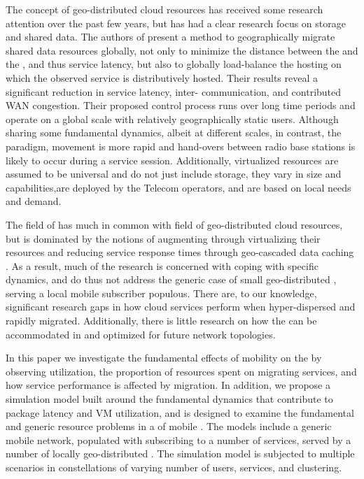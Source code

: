 The concept of geo-distributed cloud resources has received some research attention over the past few years, but has had a clear research focus on storage and shared data. The authors of \cite{agarwal2010volley} present a method to geographically migrate shared data resources globally, not only to minimize the distance between the \ue{} and the \dc{}, and thus service latency, but also to globally load-balance the hosting \dcs{} on which the observed service is distributively hosted. Their results reveal a significant reduction in service latency, inter-\dc{} communication, and contributed WAN congestion. Their proposed control process runs over long time periods and operate on a global scale with relatively geographically static users. Although sharing some fundamental dynamics, albeit at different scales, in contrast, the \xcloud{} paradigm, \ue{} movement is more rapid and hand-overs between radio base stations is likely to occur during a service session. Additionally, \xcloud{} virtualized resources are assumed to be universal and do not just include storage, they vary in size and capabilities,are  deployed by the Telecom operators, and are based on local needs and demand.

The field of \xcloud{} has much in common with field of geo-distributed cloud resources, but is dominated by the notions of augmenting \ues{} through virtualizing their resources \cite{6563280} and reducing service response times through geo-cascaded data caching \cite{1437087,ericsson_akami}. As a result, much of the research is concerned with coping with specific dynamics, and do thus not address the generic case of small geo-distributed \dcs{}, serving a local mobile subscriber populous. There are, to our knowledge, significant research gaps in how cloud services perform when hyper-dispersed and rapidly migrated. Additionally, there is little research on how the \xcloud{} can be accommodated in and optimized for future network topologies.

In this paper we investigate the fundamental effects of \ue{} mobility on the \xcloud{} by observing \dc{} utilization, the proportion of \dcs{} resources spent on migrating services, and how service performance is affected by migration. In addition, we propose a simulation model built around the fundamental dynamics that contribute to package latency and VM utilization, and is designed to examine the fundamental and generic resource problems in a \xcloud{} of mobile \ues{}. The models include a generic mobile network, populated with \ues{} subscribing to a number of services, served by a number of locally geo-distributed \dcs{}. The simulation model is subjected to multiple scenarios in constellations of varying number of users, services, and \dc{} clustering.


